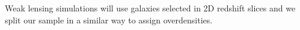 \documentclass[twocolumn,useAMS,usenatbib]{mn2e}
\newcommand{\rachel}[1]{}
\begin{document}

Weak lensing simulations will use galaxies selected in 2D redshift slices and
we split our sample in a similar way to assign overdensities.

\end{document}
